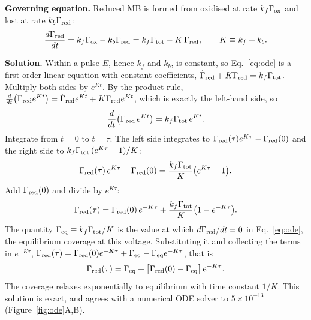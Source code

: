 \documentclass[10pt,a4paper]{article}
\numberwithin{equation}{section}
\newcommand{\Grtot}{\Gamma_{\rm tot}}
\newcommand{\Grred}{\Gamma_{\rm red}}
\newcommand{\Grox}{\Gamma_{\rm ox}}
\newcommand{\Greq}{\Gamma_{\rm eq}}
\newcommand{\figref}[1]{Figure~\ref{#1}}
\newcommand{\odeMaxErr}{\ensuremath{5\times10^{-13}}}
\begin{document}
\textbf{Governing equation.} Reduced MB is formed from oxidised at rate $k_f\Grox$
and lost at rate $k_b\Grred$:
\begin{equation}
  \frac{d\Grred}{dt}=k_f\Grox-k_b\Grred=k_f\Grtot-K\,\Grred,\qquad K\equiv k_f+k_b.
  \label{eq:ode}
\end{equation}

\textbf{Solution.} Within a pulse $E$, hence $k_f$ and $k_b$, is constant, so Eq.~\eqref{eq:ode} is a first-order linear
equation with constant coefficients, $\dot\Gamma_{\rm red}+K\Grred=k_f\Grtot$. Multiply both sides by $e^{Kt}$. By the product rule,
$\frac{d}{dt}\bigl(\Grred e^{Kt}\bigr)=\dot\Gamma_{\rm red}e^{Kt}+K\Grred e^{Kt}$, which is exactly the left-hand side, so
\[
  \frac{d}{dt}\bigl(\Grred\,e^{Kt}\bigr)=k_f\Grtot\,e^{Kt}.
\]
Integrate from $t=0$ to $t=\tau$. The left side integrates to $\Grred(\tau)e^{K\tau}-\Grred(0)$ and the right side to
$k_f\Grtot\,(e^{K\tau}-1)/K$:
\[
  \Grred(\tau)\,e^{K\tau}-\Grred(0)=\frac{k_f\Grtot}{K}\bigl(e^{K\tau}-1\bigr).
\]
Add $\Grred(0)$ and divide by $e^{K\tau}$:
\[
  \Grred(\tau)=\Grred(0)\,e^{-K\tau}+\frac{k_f\Grtot}{K}\bigl(1-e^{-K\tau}\bigr).
\]
The quantity $\Greq\equiv k_f\Grtot/K$ is the value at which $d\Grred/dt=0$ in Eq.~\eqref{eq:ode}, the equilibrium
coverage at this voltage. Substituting it and collecting the terms in $e^{-K\tau}$,
$\Grred(\tau)=\Grred(0)e^{-K\tau}+\Greq-\Greq e^{-K\tau}$, that is
\begin{equation}
  \Grred(\tau)=\Greq+\bigl[\Grred(0)-\Greq\bigr]\,e^{-K\tau}.
  \label{eq:soln}
\end{equation}
The coverage relaxes exponentially to equilibrium with time constant $1/K$. This solution is exact,
and agrees with a numerical ODE solver to $\odeMaxErr$ (\figref{fig:ode}A,B).
\end{document}
